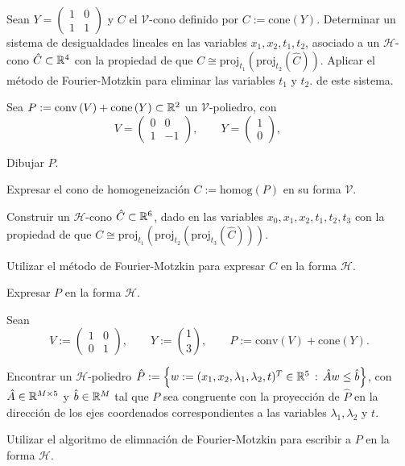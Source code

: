 \documentclass[a4paper,12pt]{article}
\newcommand{\colvector}[2]{{#1 \choose #2}}
\renewcommand{\conv}[1]{\mathrm{conv}\left(#1\right)}
\renewcommand{\cone}[1]{\mathrm{cone}\left(#1\right)}
\newcommand{\homog}[1]{\mathrm{homog}\left(#1\right)}
\newcommand{\HH}{\mathcal{H}}
\newcommand{\VV}{\mathcal{V}}
\newcommand{\proj}{\mathrm{proj}}
\begin{document}

\begin{exerciselist}

  \item Sean $Y = \left( \begin{array}{cc} 1 & 0 \\ 1 & 1 \end{array}\right)$ y $C$ el
  $\mathcal{V}$-cono definido por $C := \mathrm{cone}(Y)$. Determinar un sistema de
  desigualdades lineales en las variables $x_1, x_2, t_1, t_2$, asociado a un $\mathcal{H}$-cono $\hat{C} \subset \mathbb{R}^4$
  con la propiedad de que $C \cong \mathrm{proj}_{t_1}(\mathrm{proj}_{t_2}(\hat{C}))$.
  Aplicar el método de Fourier-Motzkin para eliminar las variables $t_1$ y $t_2$.
  de este sistema.

  \item Sea $P := \conv{V} + \cone{Y} \subset \RR^2$ un $\VV$-poliedro, con
  $$
  V = \left(
  \begin{array}{cc}
    0 & 0 \\
    1  & -1
  \end{array}
  \right),
  \qquad
  Y = \left(
  \begin{array}{c}
    1 \\
    0
  \end{array}
  \right),
  \qquad
  $$
  \begin{exerciselist}
    \item Dibujar $P$.
    \item Expresar el cono de homogeneización $C:=\homog{P}$ en su forma $\VV$.
    \item Construir un $\HH$-cono $\hat{C} \subset \mathbb{R}^6$, dado en las variables $x_0, x_1, x_2, t_1, t_2, t_3$ con la propiedad de que $C \cong \proj_{t_1}(\proj_{t_2}(\proj_{t_3}(\hat{C})))$.
    \item Utilizar el método de Fourier-Motzkin para expresar $C$ en la forma $\HH$.
    \item Expresar $P$ en la forma $\HH$.
  \end{exerciselist}

  \item Sean
  $$
  V:= \left(
  \begin{array}{cc}
  1 & 0 \\
  0 & 1
  \end{array}
  \right),
  \qquad
  Y:= \colvector{1}{3},
  \qquad
  P:= \conv{V} + \cone{Y}.
  $$

  \begin{exerciselist}
  \item Encontrar un $\mathcal{H}$-poliedro $\hat{P}:= \left\{ w:= (x_1, x_2,
  \lambda_1, \lambda_2, t)^T \in \mathbb{R}^5 \, : \, \hat{A} w \leq \hat{b} \right\}$,
  con $\hat{A} \in \mathbb{R}^{M \times 5}$ y $\hat{b} \in \mathbb{R}^M$ tal que $P$ sea
  congruente con la proyección de $\hat{P}$ en la dirección de los ejes
  coordenados correspondientes a las variables $\lambda_1, \lambda_2$ y $t$.
  \item Utilizar el algoritmo de elimnación de Fourier-Motzkin para escribir a
  $P$ en la forma $\mathcal{H}$.
  \end{exerciselist}


\end{exerciselist}
\end{document}
